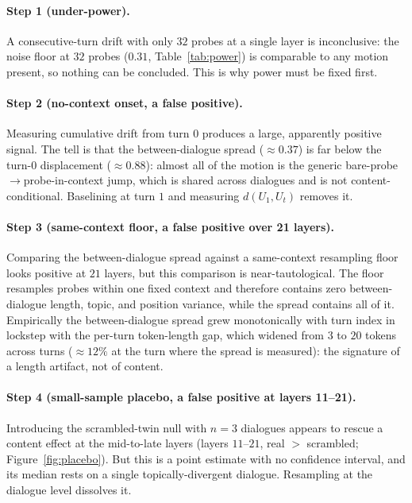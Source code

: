 \paragraph{Step 1 (under-power).} A consecutive-turn drift with only $32$ probes at a single
layer is inconclusive: the noise floor at $32$ probes ($0.31$, Table~\ref{tab:power}) is
comparable to any motion present, so nothing can be concluded. This is why power must be fixed
first.

\paragraph{Step 2 (no-context onset, a false positive).} Measuring cumulative drift from turn
$0$ produces a large, apparently positive signal. The tell is that the between-dialogue spread
($\approx 0.37$) is far below the turn-$0$ displacement ($\approx 0.88$): almost all of the
motion is the generic bare-probe$\to$probe-in-context jump, which is shared across dialogues
and is not content-conditional. Baselining at turn $1$ and measuring $d(U_1,U_t)$ removes it.

\paragraph{Step 3 (same-context floor, a false positive over 21 layers).} Comparing the
between-dialogue spread against a same-context resampling floor looks positive at $21$ layers,
but this comparison is near-tautological. The floor resamples probes within one fixed context
and therefore contains zero between-dialogue length, topic, and position variance, while the
spread contains all of it. Empirically the between-dialogue spread grew monotonically with
turn index in lockstep with the per-turn token-length gap, which widened from $3$ to $20$
tokens across turns ($\approx 12\%$ at the turn where the spread is measured): the signature
of a length artifact, not of content.

\paragraph{Step 4 (small-sample placebo, a false positive at layers 11--21).} Introducing the
scrambled-twin null with $n{=}3$ dialogues appears to rescue a content effect at the
mid-to-late layers (layers $11$--$21$, real $>$ scrambled; Figure~\ref{fig:placebo}). But this
is a point estimate with no confidence interval, and its median rests on a single
topically-divergent dialogue. Resampling at the dialogue level dissolves it.

